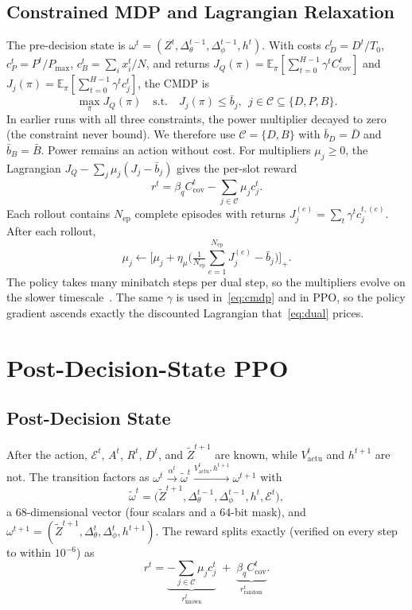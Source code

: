 \documentclass[conference]{IEEEtran}
\newcommand{\EE}{\mathbb{E}}
\newcommand{\Cset}{\mathcal{C}}
\newcommand{\om}{\omega}
\newcommand{\omt}{\widetilde{\omega}}
\newcommand{\Zt}{\widetilde{Z}}
\newcommand{\rk}{r_{\mathrm{known}}}
\newcommand{\rr}{r_{\mathrm{random}}}
\newcommand{\Vact}{V_{\mathrm{actu}}}
\newcommand{\Ccov}{C_{\mathrm{cov}}}
\begin{document}
\subsection{Constrained MDP and Lagrangian Relaxation}
The pre-decision state is $\om^t=(Z^t,\Delta_\theta^{t-1},\Delta_\phi^{t-1},h^t)$. With costs $c_D^t=D^t/T_0$, $c_P^t=P^t/P_{\max}$, $c_B^t=\sum_ix_i^t/N$, and returns $J_Q(\pi)=\EE_\pi[\sum_{t=0}^{H-1}\gamma^t\Ccov^t]$ and $J_j(\pi)=\EE_\pi[\sum_{t=0}^{H-1}\gamma^tc_j^t]$, the CMDP is
\begin{equation}
\max_\pi J_Q(\pi)\quad\text{s.t.}\quad J_j(\pi)\le\bar b_j,\ \ j\in\Cset\subseteq\{D,P,B\}.
\label{eq:cmdp}
\end{equation}
In earlier runs with all three constraints, the power multiplier decayed to zero (the constraint never bound). We therefore use $\Cset=\{D,B\}$ with $\bar b_D=\bar D$ and $\bar b_B=\bar B$. Power remains an action without cost. For multipliers $\mu_j\ge0$, the Lagrangian $J_Q-\sum_j\mu_j(J_j-\bar b_j)$ gives the per-slot reward
\begin{equation}
r^t=\beta_q\Ccov^t-\textstyle\sum_{j\in\Cset}\mu_jc_j^t.
\label{eq:reward}
\end{equation}
Each rollout contains $N_{\mathrm{ep}}$ complete episodes with returns $J_j^{(e)}=\sum_t\gamma^tc_j^{t,(e)}$. After each rollout,
\begin{equation}
\mu_j\leftarrow\Big[\mu_j+\eta_\mu\Big(\tfrac{1}{N_{\mathrm{ep}}}\textstyle\sum_{e=1}^{N_{\mathrm{ep}}}J_j^{(e)}-\bar b_j\Big)\Big]_+.
\label{eq:dual}
\end{equation}
The policy takes many minibatch steps per dual step, so the multipliers evolve on the slower timescale~\cite{tessler2019rcpo}. The same $\gamma$ is used in~\eqref{eq:cmdp} and in PPO, so the policy gradient ascends exactly the discounted Lagrangian that~\eqref{eq:dual} prices.

\section{Post-Decision-State PPO}
\label{sec:method}

\subsection{Post-Decision State}
After the action, $\mathcal{E}^t$, $A^t$, $R^t$, $D^t$, and $\Zt^{t+1}$ are known, while $\Vact^t$ and $h^{t+1}$ are not. The transition factors as $\om^t\xrightarrow{\alpha^t}\omt^t\xrightarrow{\Vact^t,h^{t+1}}\om^{t+1}$ with
\begin{equation}
\omt^t=\big(\Zt^{t+1},\Delta_\theta^{t-1},\Delta_\phi^{t-1},h^t,\mathcal{E}^t\big),
\label{eq:pds}
\end{equation}
a 68-dimensional vector (four scalars and a 64-bit mask), and $\om^{t+1}=(\Zt^{t+1},\Delta_\theta^t,\Delta_\phi^t,h^{t+1})$. The reward splits exactly (verified on every step to within $10^{-6}$) as
\begin{equation}
r^t=\underbrace{-\textstyle\sum_{j\in\Cset}\mu_jc_j^t}_{\rk^t}\;+\;\underbrace{\beta_q\Ccov^t}_{\rr^t}.
\label{eq:split}
\end{equation}
\end{document}
